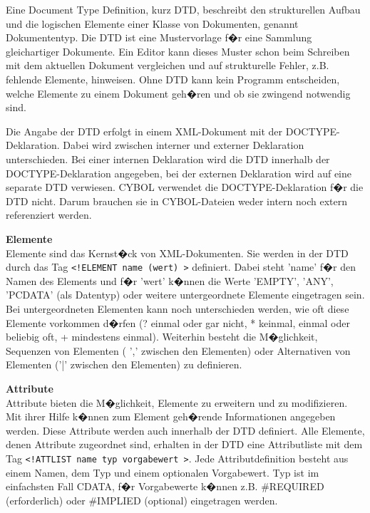       Eine Document Type Definition, kurz DTD, beschreibt den strukturellen Aufbau und die
      logischen Elemente einer Klasse von Dokumenten, genannt Dokumententyp. Die DTD ist
      eine Mustervorlage f�r eine Sammlung gleichartiger Dokumente. Ein Editor kann dieses
      Muster schon beim Schreiben mit dem aktuellen Dokument vergleichen und auf
      strukturelle Fehler, z.B. fehlende Elemente, hinweisen. Ohne DTD kann kein Programm
      entscheiden, welche Elemente zu einem Dokument geh�ren und ob sie zwingend
      notwendig sind.
      
      Die Angabe der DTD erfolgt in einem XML-Dokument mit der DOCTYPE-Deklaration. Dabei
      wird zwischen interner und externer Deklaration unterschieden. Bei einer internen
      Deklaration wird die DTD innerhalb der DOCTYPE-Deklaration angegeben, bei der
      externen Deklaration wird auf eine separate DTD verwiesen. CYBOL verwendet
      die DOCTYPE-Deklaration f�r die DTD nicht. Darum brauchen sie in CYBOL-Dateien 
      weder intern noch extern referenziert werden.

      \textbf{Elemente}\\
      Elemente sind das Kernst�ck von XML-Dokumenten. Sie werden in der DTD durch das
      Tag \verb|<!ELEMENT name (wert) >| definiert. Dabei steht 'name' f�r den Namen des 
      Elements und f�r 'wert' k�nnen die Werte 'EMPTY', 'ANY', 'PCDATA' (als Datentyp)
      oder weitere untergeordnete Elemente eingetragen sein. Bei untergeordneten 
      Elementen kann noch unterschieden werden, wie oft diese Elemente
      vorkommen d�rfen (? einmal oder gar nicht, * keinmal, einmal oder beliebig oft, 
      + mindestens einmal). Weiterhin besteht die M�glichkeit, 
      Sequenzen von Elementen ( ',' zwischen den
      Elementen) oder Alternativen von Elementen ('|' zwischen den Elementen) zu definieren.
      
      \textbf{Attribute} \\
      Attribute bieten die M�glichkeit, Elemente zu erweitern und zu modifizieren. Mit ihrer
      Hilfe k�nnen zum Element geh�rende Informationen angegeben werden. Diese Attribute
      werden auch innerhalb der DTD definiert. Alle Elemente, denen Attribute zugeordnet sind,
      erhalten in der DTD eine Attributliste mit dem Tag 
      \verb|<!ATTLIST name typ vorgabewert >|. Jede
      Attributdefinition besteht aus einem Namen, dem Typ und einem optionalen Vorgabewert.
      Typ ist im einfachsten Fall CDATA, f�r Vorgabewerte k�nnen z.B. \#REQUIRED (erforderlich)
      oder \#IMPLIED (optional) eingetragen werden.

